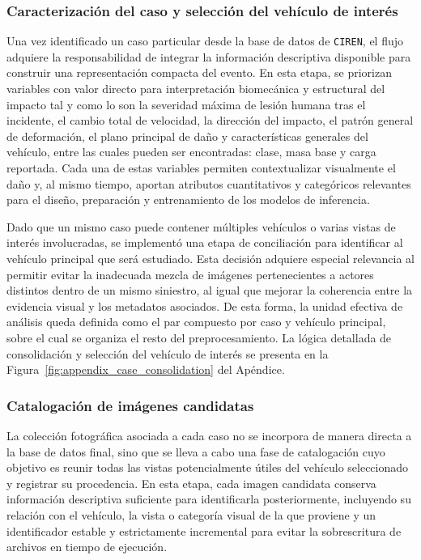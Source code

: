 \documentclass[esp]{SpeedEstimationAI_paper}
\begin{document}
\subsubsection{Caracterización del caso y selección del vehículo de interés}

Una vez identificado un caso particular desde la base de datos de \texttt{CIREN}, el flujo adquiere la responsabilidad de integrar la información descriptiva disponible para construir una representación compacta del evento. En esta etapa, se priorizan variables con valor directo para interpretación biomecánica y estructural del impacto tal y como lo son la severidad máxima de lesión humana tras el incidente, el cambio total de velocidad, la dirección del impacto, el patrón general de deformación, el plano principal de daño y características generales del vehículo, entre las cuales pueden ser encontradas: clase, masa base y carga reportada. Cada una de estas variables permiten contextualizar visualmente el daño y, al mismo tiempo, aportan atributos cuantitativos y categóricos relevantes para el diseño, preparación y entrenamiento de los modelos de inferencia.

Dado que un mismo caso puede contener múltiples vehículos o varias vistas de interés involucradas, se implementó una etapa de conciliación para identificar al vehículo principal que será estudiado. Esta decisión adquiere especial relevancia al permitir evitar la inadecuada mezcla de  imágenes pertenecientes a actores distintos dentro de un mismo siniestro, al igual que mejorar la coherencia entre la evidencia visual y los metadatos asociados. De esta forma, la unidad efectiva de análisis queda definida como el par compuesto por caso y vehículo principal, sobre el cual se organiza el resto del preprocesamiento. La lógica detallada de consolidación y selección del vehículo de interés se presenta en la Figura~\ref{fig:appendix_case_consolidation} del Apéndice.

\subsubsection{Catalogación de imágenes candidatas}

La colección fotográfica asociada a cada caso no se incorpora de manera directa a la base de datos final, sino que se lleva a cabo una fase de catalogación cuyo objetivo es reunir todas las vistas potencialmente útiles del vehículo seleccionado y registrar su procedencia. En esta etapa, cada imagen candidata conserva información descriptiva suficiente para identificarla posteriormente, incluyendo su relación con el vehículo, la vista o categoría visual de la que proviene y un identificador estable y estrictamente incremental para evitar la sobrescritura de archivos en tiempo de ejecución.
\end{document}
